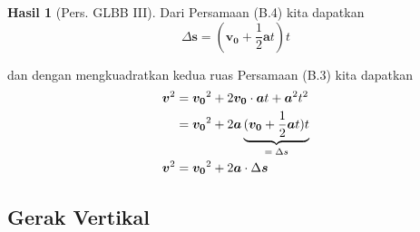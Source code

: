 \documentclass{beamer}
\theoremstyle{plain}
\theoremstyle{plain}
\theoremstyle{definition}
\newtheorem{corr}[teorema]{Hasil}
\numberwithin{equation}{section}
\begin{document}
	\begin{frame}
		\begin{corr}[Pers. GLBB III]
			\small
			Dari Persamaan (B.4) kita dapatkan
			\begin{equation*}
				\Delta \boldsymbol{s} = (\boldsymbol{v_0} + \frac{1}{2}\boldsymbol{a}t)t
			\end{equation*}
			
			dan dengan mengkuadratkan kedua ruas Persamaan (B.3) kita dapatkan
			\begin{align}
				\boldsymbol{v}^2 &= \boldsymbol{v_0}^2 + 2\boldsymbol{v_0} \cdot \boldsymbol{a}t + \boldsymbol{a}^2 t^2 \notag \\
				&= \boldsymbol{v_0}^2 +2\boldsymbol{a}\underbrace{(\boldsymbol{v_0} + \frac{1}{2}\boldsymbol{a}t)t}_{\text{$= \Delta s$}} \notag \\
				\boldsymbol{v}^2 &= \boldsymbol{v_0}^2 + 2\boldsymbol{a} \cdot \Delta \boldsymbol{s}
			\end{align}
		\end{corr}
	\end{frame}
	
	\subsection{Gerak Vertikal}
	
\end{document}
